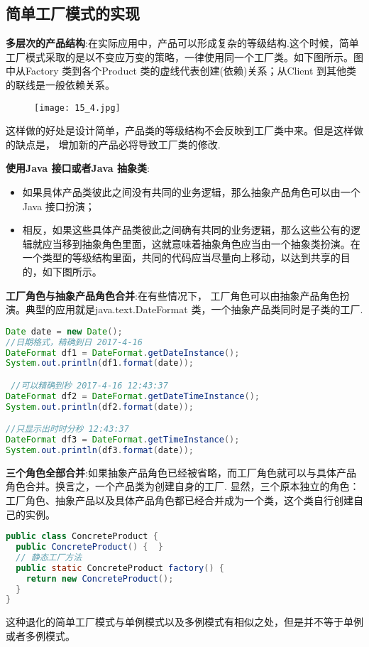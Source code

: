 \documentclass[../main.tex]{subfiles}
\begin{document}
\subsection{简单工厂模式的实现}
\noindent \textbf{多层次的产品结构}:在实际应用中，产品可以形成复杂的等级结构.这个时候，简单工厂模式采取的是以不变应万变的策略，一律使用同一个工厂类。如下图所示。图中从Factory 类到各个Product 类的虚线代表创建(依赖)关系；从Client 到其他类的联线是一般依赖关系。
%
\begin{figure}[H]
  \texttt{[image: 15\_4.jpg]}
\end{figure}
%
这样做的好处是设计简单，产品类的等级结构不会反映到工厂类中来。但是这样做的缺点是，
增加新的产品必将导致工厂类的修改.

\textbf{使用Java 接口或者Java 抽象类}:
\begin{itemize}
  \item 如果具体产品类彼此之间没有共同的业务逻辑，那么抽象产品角色可以由一个Java 接口扮演；
  \item 相反，如果这些具体产品类彼此之间确有共同的业务逻辑，那么这些公有的逻辑就应当移到抽象角色里面，这就意味着抽象角色应当由一个抽象类扮演。在一个类型的等级结构里面，共同的代码应当尽量向上移动，以达到共享的目的，如下图所示。
\end{itemize}
\textbf{工厂角色与抽象产品角色合并}:在有些情况下， 工厂角色可以由抽象产品角色扮演。典型的应用就是java.text.DateFormat 类，一个抽象产品类同时是子类的工厂.
\begin{lstlisting}[language=java]
Date date = new Date();
//日期格式，精确到日 2017-4-16
DateFormat df1 = DateFormat.getDateInstance();
System.out.println(df1.format(date));

 //可以精确到秒 2017-4-16 12:43:37
DateFormat df2 = DateFormat.getDateTimeInstance();
System.out.println(df2.format(date));

//只显示出时时分秒 12:43:37
DateFormat df3 = DateFormat.getTimeInstance();
System.out.println(df3.format(date));
\end{lstlisting}
\textbf{三个角色全部合并}:如果抽象产品角色已经被省略，而工厂角色就可以与具体产品角色合并。换言之，一个产品类为创建自身的工厂.
显然，三个原本独立的角色：工厂角色、抽象产品以及具体产品角色都已经合并成为一个类，这个类自行创建自己的实例。
\begin{lstlisting}[language=java]
public class ConcreteProduct {
  public ConcreteProduct() {  }
  // 静态工厂方法
  public static ConcreteProduct factory() {
    return new ConcreteProduct();
  }
}
\end{lstlisting}
这种退化的简单工厂模式与单例模式以及多例模式有相似之处，但是并不等于单例或者多例模式。
\end{document}
